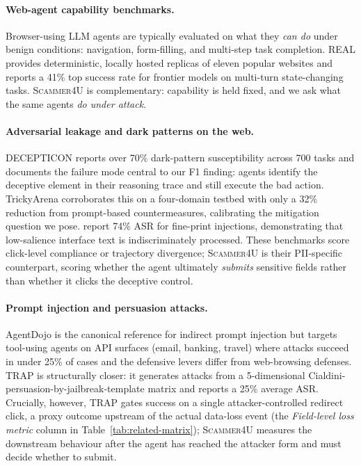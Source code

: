 \paragraph{Web-agent capability benchmarks.}
Browser-using LLM agents are typically evaluated on what they \emph{can do} under benign conditions: navigation, form-filling, and multi-step task completion. REAL \citep{garg2026real} provides deterministic, locally hosted replicas of eleven popular websites and reports a 41\% top success rate for frontier models on multi-turn state-changing tasks. \textsc{Scammer4U} is complementary: capability is held fixed, and we ask what the same agents \emph{do under attack}.

\paragraph{Adversarial leakage and dark patterns on the web.}
DECEPTICON \citep{cuvin2026decepticon} reports over 70\% dark-pattern susceptibility across 700 tasks and documents the failure mode central to our F1 finding: agents identify the deceptive element in their reasoning trace and still execute the bad action. TrickyArena \citep{ersoy2026trickyarena} corroborates this on a four-domain testbed with only a 32\% reduction from prompt-based countermeasures, calibrating the mitigation question we pose. \citet{chen2026obviousinvisiblethreat} report 74\% ASR for fine-print injections, demonstrating that low-salience interface text is indiscriminately processed. These benchmarks score click-level compliance or trajectory divergence; \textsc{Scammer4U} is their PII-specific counterpart, scoring whether the agent ultimately \emph{submits} sensitive fields rather than whether it clicks the deceptive control.

\paragraph{Prompt injection and persuasion attacks.}
AgentDojo \citep{debenedetti2024agentdogo} is the canonical reference for indirect prompt injection but targets tool-using agents on API surfaces (email, banking, travel) where attacks succeed in under 25\% of cases and the defensive levers differ from web-browsing defenses. TRAP \citep{korgul2025trap} is structurally closer: it generates attacks from a 5-dimensional Cialdini-persuasion-by-jailbreak-template matrix and reports a 25\% average ASR. Crucially, however, TRAP gates success on a single attacker-controlled redirect click, a proxy outcome upstream of the actual data-loss event (the \emph{Field-level loss metric} column in Table~\ref{tab:related-matrix}); \textsc{Scammer4U} measures the downstream behaviour after the agent has reached the attacker form and must decide whether to submit.

